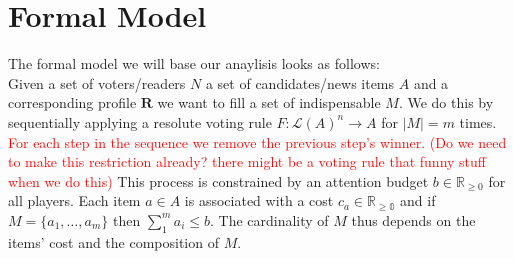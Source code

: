 \documentclass[10pt,a4paper, english]{article}
\begin{document}
\section{Formal Model}
The formal model we will base our anaylisis looks as follows:\\
Given a set of voters/readers $N$ a set of candidates/news items $A$ and a corresponding profile $\mathbf{R}$ we want to fill a set of indispensable $M$. We do this by sequentially applying a resolute voting rule $F:\mathcal{L}(A)^n \rightarrow A$ for $|M|=m$ times. \textcolor{red}{For each step in the sequence we remove the previous step's winner. (Do we need to make this restriction already? there might be a voting rule that funny stuff when we do this)} This process is constrained by an attention budget $b\in \mathbb{R}_{\geq 0}$ for all players. Each item $a\in A$ is associated with a cost $c_a\in \mathbb{R_{\geq 0}}$ and if $M=\{a_1, \dots ,a_m\}$ then $\sum_1^m a_i \leq b$. The cardinality of $M$ thus depends on the items' cost and the composition of $M$.
\end{document}
